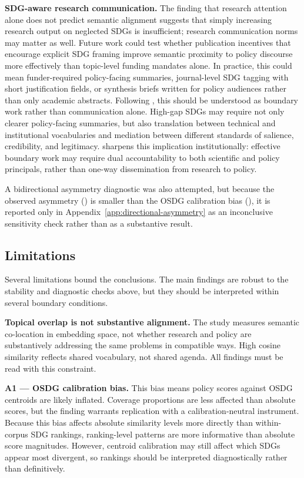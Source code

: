 \documentclass[12pt,a4paper]{article}
\begin{document}
\textbf{SDG-aware research communication.} The finding that research attention alone does not predict semantic alignment suggests that simply increasing research output on neglected SDGs is insufficient; research communication norms may matter as well. Future work could test whether publication incentives that encourage explicit SDG framing improve semantic proximity to policy discourse more effectively than topic-level funding mandates alone. In practice, this could mean funder-required policy-facing summaries, journal-level SDG tagging with short justification fields, or synthesis briefs written for policy audiences rather than only academic abstracts. Following \textcite{Cash2003}, this should be understood as boundary work rather than communication alone. High-gap SDGs may require not only clearer policy-facing summaries, but also translation between technical and institutional vocabularies and mediation between different standards of salience, credibility, and legitimacy. \textcite{Guston2001} sharpens this implication institutionally: effective boundary work may require dual accountability to both scientific and policy principals, rather than one-way dissemination from research to policy.

A bidirectional asymmetry diagnostic was also attempted, but because the observed asymmetry (\HAsymGap) is smaller than the OSDG calibration bias (\AffFifteenDiff), it is reported only in Appendix~\ref{app:directional-asymmetry} as an inconclusive sensitivity check rather than as a substantive result.

\subsection{Limitations}

Several limitations bound the conclusions. The main findings are robust to the stability and diagnostic checks above, but they should be interpreted within several boundary conditions.

\textbf{Topical overlap is not substantive alignment.} The study measures semantic co-location in embedding space, not whether research and policy are substantively addressing the same problems in compatible ways. High cosine similarity reflects shared vocabulary, not shared agenda. All findings must be read with this constraint.

\textbf{A1 --- OSDG calibration bias.} This bias means policy scores against OSDG centroids are likely inflated. Coverage proportions are less affected than absolute scores, but the finding warrants replication with a calibration-neutral instrument. Because this bias affects absolute similarity levels more directly than within-corpus SDG rankings, ranking-level patterns are more informative than absolute score magnitudes. However, centroid calibration may still affect which SDGs appear most divergent, so rankings should be interpreted diagnostically rather than definitively.
\end{document}
